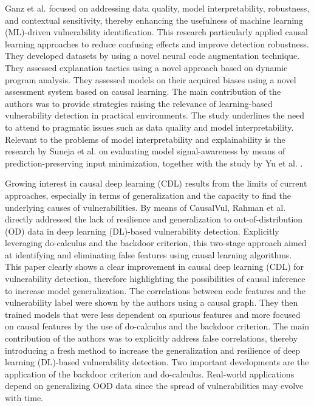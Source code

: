 \documentclass{buthesis}
\begin{document}
Ganz et al. \cite{Ganz2024} focused on addressing data quality, model interpretability, robustness, and contextual sensitivity, thereby enhancing the usefulness of machine learning (ML)-driven vulnerability identification. This research particularly applied causal learning approaches to reduce confusing effects and improve detection robustness. They developed datasets by using a novel neural code augmentation technique. They assessed explanation tactics using a novel approach based on dynamic program analysis. They assessed models on their acquired biases using a novel assessment system based on causal learning. The main contribution of the authors was to provide strategies raising the relevance of learning-based vulnerability detection in practical environments. The study underlines the need to attend to pragmatic issues such as data quality and model interpretability. Relevant to the problems of model interpretability and explainability is the research by Suneja et al. \cite{suneja2021probing} on evaluating model signal-awareness by means of prediction-preserving input minimization, together with the study by Yu et al. \cite{yu2023counterfactual}.

Growing interest in causal deep learning (CDL) results from the limits of current approaches, especially in terms of generalization and the capacity to find the underlying causes of vulnerabilities. By means of CausalVul, Rahman et al. \cite{Rahman2024ICSE} directly addressed the lack of resilience and generalization to out-of-distribution (OD) data in deep learning (DL)-based vulnerability detection. Explicitly leveraging do-calculus and the backdoor criterion, this two-stage approach aimed at identifying and eliminating false features using causal learning algorithms. This paper clearly shows a clear improvement in causal deep learning (CDL) for vulnerability detection, therefore highlighting the possibilities of causal inference to increase model generalization. The correlations between code features and the vulnerability label were shown by the authors using a causal graph. They then trained models that were less dependent on spurious features and more focused on causal features by the use of do-calculus and the backdoor criterion. The main contribution of the authors was to explicitly address false correlations, thereby introducing a fresh method to increase the generalization and resilience of deep learning (DL)-based vulnerability detection. Two important developments are the application of the backdoor criterion and do-calculus. Real-world applications depend on generalizing OOD data since the spread of vulnerabilities may evolve with time.
\end{document}
